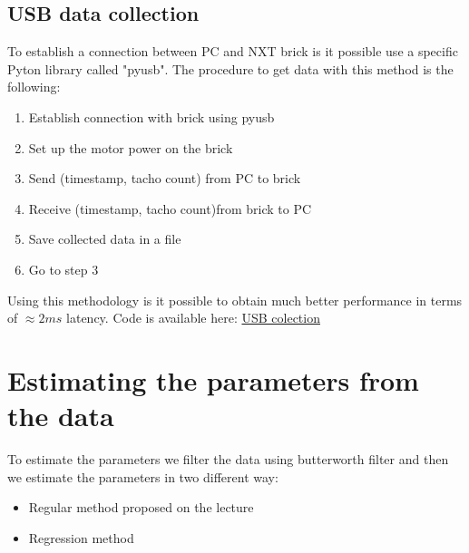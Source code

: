 \documentclass[a4paper,12pt,oneside]{article}
\begin{document}
\subsection{USB data collection}
To establish a connection between PC and NXT brick is it possible use a specific Pyton library called "pyusb".
The procedure to get data with this method is the following:
\begin{enumerate}
\item Establish connection with brick using pyusb
\item Set up the motor power on the brick
\item Send (timestamp,  tacho count) from PC to brick
\item Receive (timestamp,  tacho count)from brick to PC
\item Save collected data in a file
\item Go to step 3
\end{enumerate}
Using this methodology is it possible to obtain much better performance in terms of $\approx 2ms$ latency. 
Code is available here: \href{https://github.com/AliaksandrSiarohin/AppliedRobotics/usb_collector}{USB colection}
\section {Estimating the parameters from the data}
To estimate the parameters we filter the data using butterworth filter and then we estimate the parameters in two different way:
\begin{itemize}
\item Regular method proposed on the lecture
\item Regression method
\end{itemize}
\end{document}
